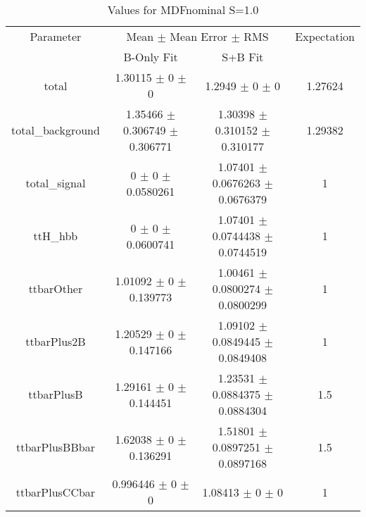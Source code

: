 \begin{table}
\centering
\caption{Values for MDFnominal S=1.0}
\begin{tabular}{cccc}
\toprule
Parameter & \multicolumn{2}{c}{Mean $\pm$ Mean Error $\pm$ RMS} & Expectation\\
 & B-Only Fit & S+B Fit & \\
\midrule
total & \num{1.30115} $\pm$ \num{0} $\pm$ \num{0} & \num{1.2949} $\pm$ \num{0} $\pm$ \num{0} & \num{1.27624}\\
total\_background & \num{1.35466} $\pm$ \num{0.306749} $\pm$ \num{0.306771} & \num{1.30398} $\pm$ \num{0.310152} $\pm$ \num{0.310177} & \num{1.29382}\\
total\_signal & \num{0} $\pm$ \num{0} $\pm$ \num{0.0580261} & \num{1.07401} $\pm$ \num{0.0676263} $\pm$ \num{0.0676379} & \num{1}\\
ttH\_hbb & \num{0} $\pm$ \num{0} $\pm$ \num{0.0600741} & \num{1.07401} $\pm$ \num{0.0744438} $\pm$ \num{0.0744519} & \num{1}\\
ttbarOther & \num{1.01092} $\pm$ \num{0} $\pm$ \num{0.139773} & \num{1.00461} $\pm$ \num{0.0800274} $\pm$ \num{0.0800299} & \num{1}\\
ttbarPlus2B & \num{1.20529} $\pm$ \num{0} $\pm$ \num{0.147166} & \num{1.09102} $\pm$ \num{0.0849445} $\pm$ \num{0.0849408} & \num{1}\\
ttbarPlusB & \num{1.29161} $\pm$ \num{0} $\pm$ \num{0.144451} & \num{1.23531} $\pm$ \num{0.0884375} $\pm$ \num{0.0884304} & \num{1.5}\\
ttbarPlusBBbar & \num{1.62038} $\pm$ \num{0} $\pm$ \num{0.136291} & \num{1.51801} $\pm$ \num{0.0897251} $\pm$ \num{0.0897168} & \num{1.5}\\
ttbarPlusCCbar & \num{0.996446} $\pm$ \num{0} $\pm$ \num{0} & \num{1.08413} $\pm$ \num{0} $\pm$ \num{0} & \num{1}\\
\bottomrule
\end{tabular}
\end{table}